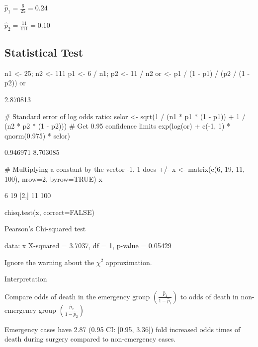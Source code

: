 \bi
\item $\hat{p}_1 = \frac{6}{25} = 0.24$
\item $\hat{p}_2 = \frac{11}{111} = 0.10$
\ei

\subsection{Statistical Test}
\begin{Schunk}
\begin{Sinput}
n1 <- 25;     n2 <- 111
p1 <- 6 / n1; p2 <- 11 / n2
or <- p1 / (1 - p1) / (p2 / (1 - p2))
or
\end{Sinput}
\begin{Soutput}
[1] 2.870813
\end{Soutput}
\begin{Sinput}
# Standard error of log odds ratio:
selor <- sqrt(1 / (n1 * p1 * (1 - p1)) + 1 / (n2 * p2 * (1 - p2)))
# Get 0.95 confidence limits
exp(log(or) + c(-1, 1) * qnorm(0.975) * selor)
\end{Sinput}
\begin{Soutput}
[1] 0.946971 8.703085
\end{Soutput}
\begin{Sinput}
# Multiplying a constant by the vector -1, 1 does +/-
x <- matrix(c(6, 19, 11, 100), nrow=2, byrow=TRUE)
x
\end{Sinput}
\begin{Soutput}
     [,1] [,2]
[1,]    6   19
[2,]   11  100
\end{Soutput}
\begin{Sinput}
chisq.test(x, correct=FALSE)
\end{Sinput}
\begin{Soutput}

	Pearson's Chi-squared test

data:  x
X-squared = 3.7037, df = 1, p-value = 0.05429
\end{Soutput}
\end{Schunk}
Ignore the warning about the $\chi^2$ approximation.
\bi
\item Interpretation
 \bi
 \item Compare odds of death in the emergency group
   $\left(\frac{\hat{p}_1}{1-\hat{p}_1}\right)$ to odds of death in
   non-emergency group  $\left(\frac{\hat{p}_2}{1-\hat{p}_2}\right)$ 
 \item Emergency cases have 2.87 (0.95 CI: [0.95, 3.36]) fold
   increased odds times of death during surgery compared to
   non-emergency cases. 
 \ei
\ei

